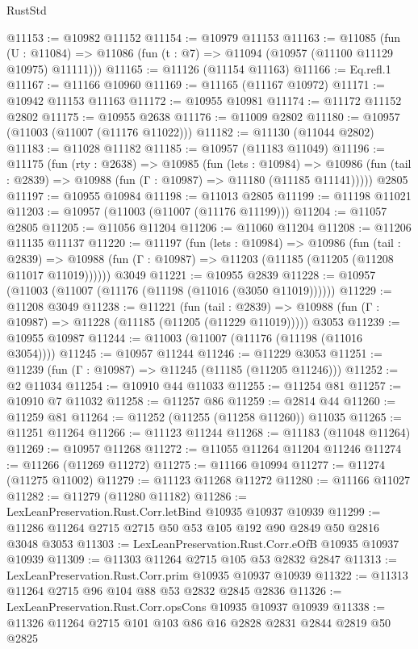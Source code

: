 \begin{lexlean}{RustStd}
\begin{coremodule}
{\begin{coremodule}
{{{{{{{{{{{{{{{{{{{{{{{{{{{{{{{{{@11153 := @10982 @11152
@11154 := @10979 @11153
@11163 := @11085
    (fun (U : @11084) => @11086 (fun (t : @7) => @11094 (@10957 (@11100 @11129 @10975) @11111)))
@11165 := @11126 (@11154 @11163)
@11166 := Eq.refl.{1}
@11167 := @11166 @10960
@11169 := @11165 (@11167 @10972)
@11171 := @10942 @11153 @11163
@11172 := @10955 @10981
@11174 := @11172 @11152 @2802
@11175 := @10955 @2638
@11176 := @11009 @2802
@11180 := @10957 (@11003 (@11007 (@11176 @11022)))
@11182 := @11130 (@11044 @2802)
@11183 := @11028 @11182
@11185 := @10957 (@11183 @11049)
@11196 := @11175
    (fun (rty : @2638) =>
    @10985
      (fun (lets : @10984) =>
      @10986 (fun (tail : @2839) => @10988 (fun (Γ : @10987) => @11180 (@11185 @11141)))))
    @2805
@11197 := @10955 @10984
@11198 := @11013 @2805
@11199 := @11198 @11021
@11203 := @10957 (@11003 (@11007 (@11176 @11199)))
@11204 := @11057 @2805
@11205 := @11056 @11204
@11206 := @11060 @11204
@11208 := @11206 @11135 @11137
@11220 := @11197
    (fun (lets : @10984) =>
    @10986
      (fun (tail : @2839) =>
      @10988 (fun (Γ : @10987) => @11203 (@11185 (@11205 (@11208 @11017 @11019))))))
    @3049
@11221 := @10955 @2839
@11228 := @10957 (@11003 (@11007 (@11176 (@11198 (@11016 (@3050 @11019))))))
@11229 := @11208 @3049
@11238 := @11221
    (fun (tail : @2839) => @10988 (fun (Γ : @10987) => @11228 (@11185 (@11205 (@11229 @11019)))))
    @3053
@11239 := @10955 @10987
@11244 := @11003 (@11007 (@11176 (@11198 (@11016 @3054))))
@11245 := @10957 @11244
@11246 := @11229 @3053
@11251 := @11239 (fun (Γ : @10987) => @11245 (@11185 (@11205 @11246)))
@11252 := @2 @11034
@11254 := @10910 @44 @11033
@11255 := @11254 @81
@11257 := @10910 @7 @11032
@11258 := @11257 @86
@11259 := @2814 @44
@11260 := @11259 @81
@11264 := @11252 (@11255 (@11258 @11260)) @11035
@11265 := @11251 @11264
@11266 := @11123 @11244
@11268 := @11183 (@11048 @11264)
@11269 := @10957 @11268
@11272 := @11055 @11264 @11204 @11246
@11274 := @11266 (@11269 @11272)
@11275 := @11166 @10994
@11277 := @11274 (@11275 @11002)
@11279 := @11123 @11268 @11272
@11280 := @11166 @11027
@11282 := @11279 (@11280 @11182)
@11286 := LexLeanPreservation.Rust.Corr.letBind @10935 @10937 @10939
@11299 := @11286 @11264 @2715 @2715 @50 @53 @105 @192 @90 @2849 @50 @2816 @3048 @3053
@11303 := LexLeanPreservation.Rust.Corr.eOfB @10935 @10937 @10939
@11309 := @11303 @11264 @2715 @105 @53 @2832 @2847
@11313 := LexLeanPreservation.Rust.Corr.prim @10935 @10937 @10939
@11322 := @11313 @11264 @2715 @96 @104 @88 @53 @2832 @2845 @2836
@11326 := LexLeanPreservation.Rust.Corr.opsCons @10935 @10937 @10939
@11338 := @11326 @11264 @2715 @101 @103 @86 @16 @2828 @2831 @2844 @2819 @50 @2825
}}}}}}}}}}}}}}}}}}}}}}}}}}}}}}}}}
\end{coremodule}}
\end{coremodule}
\end{lexlean}
